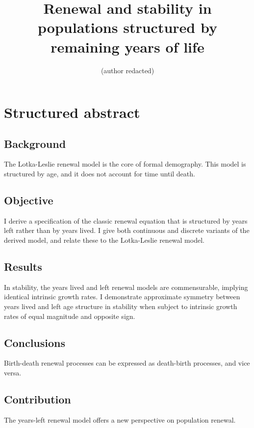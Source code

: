 \documentclass[12pt,oneside,a4paper,leqno]{article}
\newcommand\ackn[1]{%
  \begingroup
  \renewcommand\thefootnote{}\footnote{#1}%
  \addtocounter{footnote}{-1}%
  \endgroup
}
\begin{document}
\title{Renewal and stability in populations structured by remaining years of
life}
\author{(author redacted)}
\maketitle




\section*{Structured abstract}

\subsection*{Background}
The Lotka-Leslie renewal model is the core of formal demography. This model is
structured by age, and it does not account for time until death.

\subsection*{Objective}
I derive a specification of the classic renewal equation that is structured by
years left rather than by years lived. I give both continuous
and discrete variants of the derived model, and relate these to the Lotka-Leslie
renewal model.

\subsection*{Results}
In stability, the years lived and left renewal models are
commensurable, implying identical intrinsic growth rates.
I demonstrate approximate symmetry between years lived and left age structure in
stability when subject to intrinsic growth rates of equal magnitude and opposite
sign.

\subsection*{Conclusions}
Birth-death renewal processes can be expressed as death-birth processes, and
vice versa.

\subsection*{Contribution}
The years-left renewal model offers a new perspective on population renewal.
\vspace{2cm}
\end{document}
